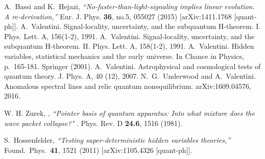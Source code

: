 \documentclass[12pt]{article}
\begin{document}
\begin{thebibliography}{99}
{ %
A.~Bassi and K.~Hejazi,
{\sl ``No-faster-than-light-signaling implies linear evolution. A re-derivation,''}
Eur. J. Phys. \textbf{36}, no.5, 055027 (2015)
[arXiv:1411.1768 [quant-ph]].
 A.~Valentini. Signal-locality, uncertainty, and the subquantum H-theorem. I. Phys. Lett. A, 156(1-2), 1991.
 A.~Valentini. Signal-locality, uncertainty, and the subquantum H-theorem. II. Phys. Lett. A, 158(1-2), 1991.
 A.~Valentini. Hidden variables, statistical mechanics and the early universe. In Chance in Physics, p.\ 165-181. Springer
(2001).
 A.~Valentini. Astrophysical and cosmological tests of quantum theory. J. Phys. A, 40 (12), 2007.
 N.~G.~Underwood and A.~Valentini. Anomalous spectral lines and relic quantum nonequilibrium. arXiv:1609.04576, 2016.

 
 W. H. Zurek, , {\sl ``Pointer basis of quantum apparatus: Into what mixture does the wave packet collapse?" }. Phys. Rev. D {\bf 24.6}, 1516 (1981).

  S.~Hossenfelder,
  {\sl ``Testing super-deterministic hidden variables theories,''}
  Found.\ Phys.\  {\bf 41}, 1521 (2011)
  [arXiv:1105.4326 [quant-ph]].



 
 
 
}


\end{thebibliography}
\end{document}
